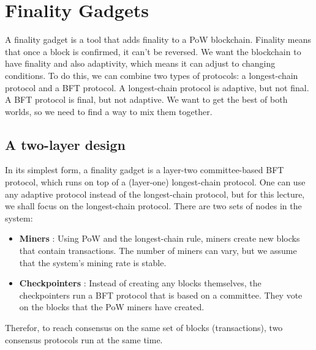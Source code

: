 	\section{Finality Gadgets}	
	A finality gadget is a tool that adds finality to a PoW blockchain. Finality means that once a block is confirmed, it can’t be reversed. We want the blockchain to have finality and also adaptivity, which means it can adjust to changing conditions. To do this, we can combine two types of protocols: a longest-chain protocol and a BFT protocol. A longest-chain protocol is adaptive, but not final. A BFT protocol is final, but not adaptive. We want to get the best of both worlds, so we need to find a way to mix them together.
	
	\subsection{A two-layer design}
	In its simplest form, a finality gadget is a layer-two committee-based BFT protocol, which runs on top of a (layer-one) longest-chain protocol. One can use any adaptive protocol instead of the longest-chain protocol, but for this lecture, we shall focus on the longest-chain protocol. There are two sets of nodes in the system:
	\begin{itemize}
		\item \textbf{Miners} : Using PoW and the longest-chain rule, miners create new blocks that contain transactions. The number of miners can vary, but we assume that the system’s mining rate is stable.
		\item \textbf{Checkpointers} : Instead of creating any blocks themselves, the checkpointers run a BFT protocol that is based on a committee. They vote on the blocks that the PoW miners have created.
	\end{itemize}
	Therefor, to reach consensus on the same set of blocks (transactions), two consensus protocols run at the same time.
